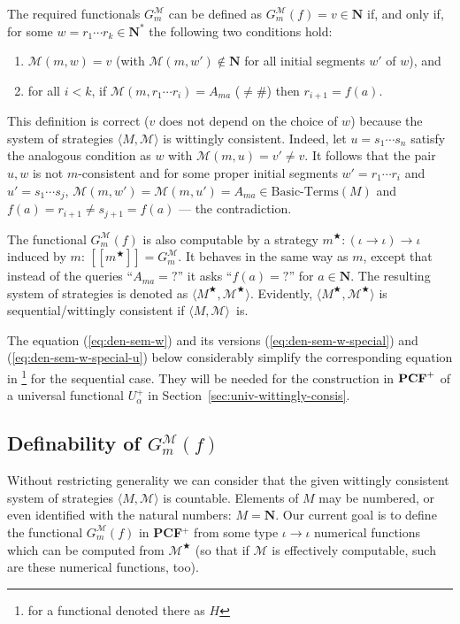 \documentclass[fleqn]{LMCS}
\theoremstyle{plain}\newtheorem{satz}[thm]{Satz}
\theoremstyle{plain}\newtheorem{hyp}[thm]{Hypothesis}
\theoremstyle{plain}\newtheorem{hyps}[thm]{Hypotheses}
\theoremstyle{definition}\newtheorem{note}[thm]{Note}
\newcommand{\arr}{\rightarrow}
\newcommand{\la}{\langle}
\newcommand{\ra}{\rangle}
\newcommand{\Dsem}[1]{[\![ #1 ]\!]}
\newcommand{\tuple}[1]{\la #1 \ra}
\newcommand{\G}{G}
\newcommand{\NN}{\mathbf{N}}
\newcommand{\PCF}{\mbox{\bf PCF}}
\newcommand{\MM}{{\mathcal M}}
\newcommand{\sM}{M^{\bigstar}}
\newcommand{\sm}{m^{\bigstar}}
\newcommand{\sMM}{\MM^{\bigstar}}
\newcommand{\?}{\mbox{?}}
\begin{document}
The required functionals $\G^{\MM}_m$ can be defined as 
$\G^{\MM}_m(f)=v\in\NN$ if, and only if, for some 
$w=r_1\cdots r_k\in\NN^*$ the following two conditions hold:
\begin{enumerate}[(1)]
\item 
$\MM(m,w)=v$ (with $\MM(m,w')\not\in\NN$ for all initial segments 
$w'$ of $w$), and 
\item
for all $i<k$, 
if $\MM(m,r_1\cdots r_i)=A_{ma}$ (${}\ne\#$) then $r_{i+1}=f(a)$.
\end{enumerate}
This definition is correct ($v$ does not depend on the choice of 
$w$) because the system of strategies $\tuple{M,\MM}$ is 
wittingly consistent. 
Indeed, let $u=s_1\cdots s_n$ satisfy the analogous condition 
as $w$ with $\MM(m,u)=v'\ne v$. It follows that 
the pair $u,w$ is not $m$-consistent and for some proper 
initial segments $w'=r_1\cdots r_i$ and $u'=s_1\cdots s_j$,  
$\MM(m,w')=\MM(m,u')=A_{ma}\in\mbox{Basic-Terms}(M)$ and 
$f(a)=r_{i+1}\ne s_{j+1}=f(a)$ --- the contradiction.

The functional $\G^{\MM}_m(f)$ is also computable by a strategy 
$\sm:(\iota\arr\iota)\arr\iota$ 
\linebreak
induced by $m$: $\Dsem{\sm}=\G^{\MM}_m$. 
It behaves in the same way as $m$, except that 
instead of the queries 
``$A_{ma}={?}$'' it asks ``$f(a)={?}$'' for $a\in\NN$. 
The resulting system of 
strategies is denoted as $\tuple{\sM,\sMM}$. 
Evidently, $\tuple{\sM,\sMM}$ is sequential/wittingly 
consistent if $\tuple{M,\MM}$~is. 

The equation (\ref{eq:den-sem-w}) and its versions 
(\ref{eq:den-sem-w-special}) and (\ref{eq:den-sem-w-special-u}) below 
considerably simplify the corresponding equation in \cite{Saz76AL}\footnote{for a functional denoted there as $H$
} 
for the sequential case.
They will be needed for the construction in $\PCF^+$ of a universal 
functional $U^+_\alpha$ in Section~\ref{sec:univ-wittingly-consis}.  

\subsection{Definability of \texorpdfstring{$\G^{\MM}_m(f)$}{G-M-m(f)}}
\label{sec:def-of-F}

\noindent
Without restricting generality we can consider that 
the given wittingly consistent 
system of strategies $\tuple{M,\MM}$ 
is countable. 
Elements of $M$ may be numbered, or even identified with 
the natural numbers: $M=\NN$. Our current goal is to define 
the functional 
$\G^{\MM}_m(f)$ in \PCF$^+$ from some type 
$\iota\arr\iota$ numerical functions 
which can be computed from $\sMM$ (so that if $\MM$ 
is effectively computable, such are these numerical 
functions, too). 
\end{document}
